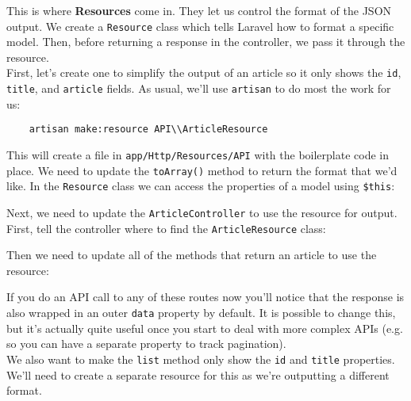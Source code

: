 This is where \textbf{Resources} come in. They let us control the format of the JSON output. We create a \texttt{Resource} class which tells Laravel how to format a specific model. Then, before returning a response in the controller, we pass it through the resource.
\\

First, let's create one to simplify the output of an article so it only shows the \texttt{id}, \texttt{title}, and \texttt{article} fields. As usual, we'll use \texttt{artisan} to do most the work for us:

\begin{verbatim}
    artisan make:resource API\\ArticleResource
\end{verbatim}

This will create a file in \texttt{app/Http/Resources/API} with the boilerplate code in place. We need to update the \texttt{toArray()} method to return the format that we'd like. In the \texttt{Resource} class we can access the properties of a model using \texttt{\$this}:


Next, we need to update the \texttt{ArticleController} to use the resource for output.
\\

First, tell the controller where to find the \texttt{ArticleResource} class:


Then we need to update all of the methods that return an article to use the resource:


If you do an API call to any of these routes now you'll notice that the response is also wrapped in an outer \texttt{data} property by default. It is possible to change this, but it's actually quite useful once you start to deal with more complex APIs (e.g. so you can have a separate property to track pagination).
\\

We also want to make the \texttt{list} method only show the \texttt{id} and \texttt{title} properties. We'll need to create a separate resource for this as we're outputting a different format.
\\

